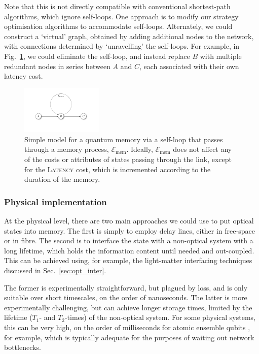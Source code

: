 Note that this is not directly compatible with conventional shortest-path algorithms, which ignore self-loops. One approach is to modify our strategy optimisation algorithms to accommodate self-loops. Alternately, we could construct a `virtual' graph, obtained by adding additional nodes to the network, with connections determined by `unravelling' the self-loops. For example, in Fig.~\ref{fig:memory}, we could eliminate the self-loop, and instead replace $B$ with multiple redundant nodes in series between $A$ and $C$, each associated with their own latency cost.

\begin{figure}[!htb]
\includegraphics[width=0.35\textwidth]{memory}
\caption{Simple model for a quantum memory via a self-loop that passes through a memory process, $\mathcal{E}_\text{mem}$. Ideally, $\mathcal{E}_\text{mem}$ does not affect any of the costs or attributes of states passing through the link, except for the \textsc{Latency} cost, which is incremented according to the duration of the memory.} \label{fig:memory}
\end{figure}

%
%

\subsubsection{Physical implementation}

At the physical level, there are two main approaches we could use to put optical states into memory. The first is simply to employ delay lines, either in free-space or in fibre. The second is to interface the state with a non-optical system with a long lifetime, which holds the information content until needed and out-coupled. This can be achieved using, for example, the light-matter interfacing techniques discussed in Sec.~\ref{sec:opt_inter}.

The former is experimentally straightforward, but plagued by loss, and is only suitable over short timescales, on the order of nanoseconds. The latter is more experimentally challenging, but can achieve longer storage times, limited by the lifetime ($T_1$- and $T_2$-times) of the non-optical system. For some physical systems, this can be very high, on the order of milliseconds for atomic ensemble qubits \cite{bib:Duan01, bib:Duan02, bib:LauratKimble07}, for example, which is typically adequate for the purposes of waiting out network bottlenecks.

